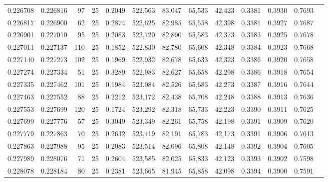 \begin{tabular}{rrrrrrrrrrrrr}
0.226708 & 0.226816 &    97 &  25 &                                     0.2049 & 522,563 &  83,047 &  65,533 &  42,423 & 0.3381 & 0.3930 & 0.7693 \\
0.226817 & 0.226900 &    62 &  25 &                                     0.2874 & 522,625 &  82,985 &  65,558 &  42,398 & 0.3381 & 0.3927 & 0.7687 \\
0.226901 & 0.227010 &    95 &  25 &                                     0.2083 & 522,720 &  82,890 &  65,583 &  42,373 & 0.3383 & 0.3925 & 0.7678 \\
0.227011 & 0.227137 &   110 &  25 &                                     0.1852 & 522,830 &  82,780 &  65,608 &  42,348 & 0.3384 & 0.3923 & 0.7668 \\
0.227140 & 0.227273 &   102 &  25 &                                     0.1969 & 522,932 &  82,678 &  65,633 &  42,323 & 0.3386 & 0.3920 & 0.7658 \\
0.227274 & 0.227334 &    51 &  25 &                                     0.3289 & 522,983 &  82,627 &  65,658 &  42,298 & 0.3386 & 0.3918 & 0.7654 \\
0.227335 & 0.227462 &   101 &  25 &                                     0.1984 & 523,084 &  82,526 &  65,683 &  42,273 & 0.3387 & 0.3916 & 0.7644 \\
0.227463 & 0.227552 &    88 &  25 &                                     0.2212 & 523,172 &  82,438 &  65,708 &  42,248 & 0.3388 & 0.3913 & 0.7636 \\
0.227553 & 0.227699 &   120 &  25 &                                     0.1724 & 523,292 &  82,318 &  65,733 &  42,223 & 0.3390 & 0.3911 & 0.7625 \\
0.227699 & 0.227776 &    57 &  25 &                                     0.3049 & 523,349 &  82,261 &  65,758 &  42,198 & 0.3391 & 0.3909 & 0.7620 \\
0.227779 & 0.227863 &    70 &  25 &                                     0.2632 & 523,419 &  82,191 &  65,783 &  42,173 & 0.3391 & 0.3906 & 0.7613 \\
0.227863 & 0.227988 &    95 &  25 &                                     0.2083 & 523,514 &  82,096 &  65,808 &  42,148 & 0.3392 & 0.3904 & 0.7605 \\
0.227989 & 0.228076 &    71 &  25 &                                     0.2604 & 523,585 &  82,025 &  65,833 &  42,123 & 0.3393 & 0.3902 & 0.7598 \\
0.228078 & 0.228184 &    80 &  25 &                                     0.2381 & 523,665 &  81,945 &  65,858 &  42,098 & 0.3394 & 0.3900 & 0.7591 \\

\end{tabular}
